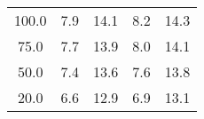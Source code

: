 \begin{tabular}{ccccc}
\hline
100.0 & 7.9 & 14.1 & 8.2 & 14.3 \\
75.0 & 7.7 & 13.9 & 8.0 & 14.1 \\
50.0 & 7.4 & 13.6 & 7.6 & 13.8 \\
20.0 & 6.6 & 12.9 & 6.9 & 13.1 \\
\hline
\end{tabular}
